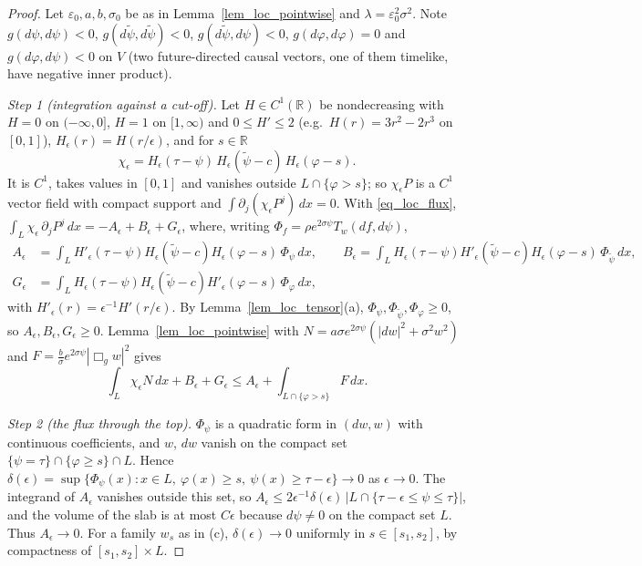 \documentclass[11pt,a4paper,reqno]{amsart}
\theoremstyle{definition}
\numberwithin{equation}{section}
\newcommand{\R}{\mathbb{R}}
\begin{document}
\begin{proof}
Let $\varepsilon_0,a,b,\sigma_0$ be as in Lemma~\ref{lem_loc_pointwise} and $\lambda=\varepsilon_0^2\sigma^2$. Note
$g(d\psi,d\psi)<0$, $g(d\tilde\psi,d\tilde\psi)<0$, $g(d\tilde\psi,d\psi)<0$, $g(d\varphi,d\varphi)=0$ and
$g(d\varphi,d\psi)<0$ on $V$ (two future-directed causal vectors, one of them timelike, have negative inner product).

\emph{Step 1 (integration against a cut-off).} Let $H\in C^1(\R)$ be nondecreasing with $H=0$ on $(-\infty,0]$, $H=1$ on
$[1,\infty)$ and $0\le H'\le2$ (e.g.\ $H(r)=3r^2-2r^3$ on $[0,1]$), $H_\epsilon(r)=H(r/\epsilon)$, and for $s\in\R$
\[
\chi_\epsilon=H_\epsilon(\tau-\psi)\,H_\epsilon(\tilde\psi-c)\,H_\epsilon(\varphi-s).
\]
It is $C^1$, takes values in $[0,1]$ and vanishes outside $L\cap\{\varphi>s\}$; so $\chi_\epsilon P$ is a $C^1$ vector field
with compact support and $\int\partial_j(\chi_\epsilon P^j)\,dx=0$. With \eqref{eq_loc_flux},
$\int_L\chi_\epsilon\,\partial_jP^j\,dx=-A_\epsilon+B_\epsilon+G_\epsilon$, where, writing $\Phi_f=\rho e^{2\sigma\psi}T_w(df,d\psi)$,
\begin{align*}
A_\epsilon&=\int_LH'_\epsilon(\tau-\psi)H_\epsilon(\tilde\psi-c)H_\epsilon(\varphi-s)\,\Phi_\psi\,dx,\qquad
B_\epsilon=\int_LH_\epsilon(\tau-\psi)H'_\epsilon(\tilde\psi-c)H_\epsilon(\varphi-s)\,\Phi_{\tilde\psi}\,dx,\\
G_\epsilon&=\int_LH_\epsilon(\tau-\psi)H_\epsilon(\tilde\psi-c)H'_\epsilon(\varphi-s)\,\Phi_\varphi\,dx,
\end{align*}
with $H'_\epsilon(r)=\epsilon^{-1}H'(r/\epsilon)$. By Lemma~\ref{lem_loc_tensor}(a), $\Phi_\psi,\Phi_{\tilde\psi},\Phi_\varphi\ge0$,
so $A_\epsilon,B_\epsilon,G_\epsilon\ge0$. Lemma~\ref{lem_loc_pointwise} with
$N=a\sigma e^{2\sigma\psi}(|dw|^2+\sigma^2w^2)$ and $F=\frac b\sigma e^{2\sigma\psi}|\Box_gw|^2$ gives
\begin{equation}\label{eq_loc_core}
\int_L\chi_\epsilon N\,dx+B_\epsilon+G_\epsilon\le A_\epsilon+\int_{L\cap\{\varphi>s\}}F\,dx .
\end{equation}

\emph{Step 2 (the flux through the top).} $\Phi_\psi$ is a quadratic form in $(dw,w)$ with continuous coefficients, and $w$,
$dw$ vanish on the compact set $\{\psi=\tau\}\cap\{\varphi\ge s\}\cap L$. Hence
$\delta(\epsilon)=\sup\{\Phi_\psi(x):x\in L,\ \varphi(x)\ge s,\ \psi(x)\ge\tau-\epsilon\}\to0$ as $\epsilon\to0$. The integrand
of $A_\epsilon$ vanishes outside this set, so $A_\epsilon\le2\epsilon^{-1}\delta(\epsilon)\,|L\cap\{\tau-\epsilon\le\psi\le\tau\}|$,
and the volume of the slab is at most $C\epsilon$ because $d\psi\ne0$ on the compact set $L$. Thus $A_\epsilon\to0$. For a
family $w_s$ as in (c), $\delta(\epsilon)\to0$ uniformly in $s\in[s_1,s_2]$, by compactness of $[s_1,s_2]\times L$.


\end{proof}
\end{document}

